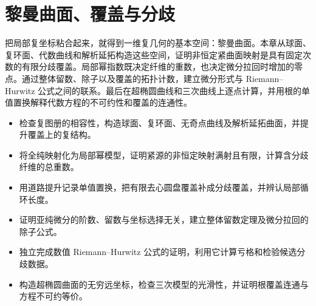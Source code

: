 
% 
% 

\chapter{黎曼曲面、覆盖与分歧}
\label{g4:ch:02}

\begin{chapterabstract}
	把局部复坐标粘合起来，就得到一维复几何的基本空间：黎曼曲面。本章从球面、复环面、代数曲线和解析延拓构造这些空间，证明非恒定紧曲面映射是具有固定次数的有限分歧覆盖。局部幂指数既决定纤维的重数，也决定微分拉回时增加的零点。通过整体留数、除子以及覆盖的拓扑计数，建立微分形式与 Riemann--Hurwitz 公式之间的联系。最后在超椭圆曲线和三次曲线上逐点计算，并用根的单值置换解释代数方程的不可约性和覆盖的连通性。
\end{chapterabstract}

\begin{learninggoals}
	\begin{itemize}
		\item 检查复图册的相容性，构造球面、复环面、无奇点曲线及解析延拓曲面，并提升覆盖上的复结构。
		\item 将全纯映射化为局部幂模型，证明紧源的非恒定映射满射且有限，计算含分歧纤维的总重数。
		\item 用道路提升记录单值置换，把有限去心圆盘覆盖补成分歧覆盖，并辨认局部循环长度。
		\item 证明亚纯微分的阶数、留数与坐标选择无关，建立整体留数定理及微分拉回的除子公式。
		\item 独立完成数值 Riemann--Hurwitz 公式的证明，利用它计算亏格和检验候选分歧数据。
		\item 构造超椭圆曲面的无穷远坐标，检查三次模型的光滑性，并证明根覆盖连通与方程不可约等价。
	\end{itemize}
\end{learninggoals}

